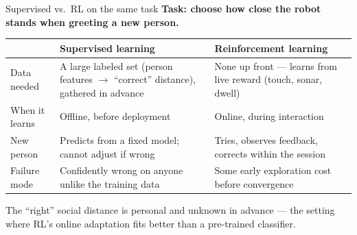 \documentclass[aspectratio=169,10pt]{beamer}
\begin{document}
\begin{frame}{Supervised vs.\ RL on the same task}
  \footnotesize
  \textbf{Task: choose how close the robot stands when greeting a new person.}
  \begin{table}
    \begin{tabular}{@{}>{\raggedright\arraybackslash}p{2.1cm}>{\raggedright\arraybackslash}p{4.1cm}>{\raggedright\arraybackslash}p{4.7cm}@{}}
      \toprule
       & \textbf{Supervised learning} & \textbf{Reinforcement learning} \\
      \midrule
      Data needed & A large labeled set (person features $\to$ ``correct'' distance), gathered in advance & None up front --- learns from live reward (touch, sonar, dwell) \\
      \addlinespace
      When it learns & Offline, before deployment & Online, during interaction \\
      \addlinespace
      New person & Predicts from a fixed model; cannot adjust if wrong & Tries, observes feedback, corrects within the session \\
      \addlinespace
      Failure mode & Confidently wrong on anyone unlike the training data & Some early exploration cost before convergence \\
      \bottomrule
    \end{tabular}
  \end{table}
  \vspace{0.2em}
  The ``right'' social distance is personal and unknown in advance --- the setting where RL's online adaptation fits better than a pre-trained classifier.
\end{frame}
\end{document}

